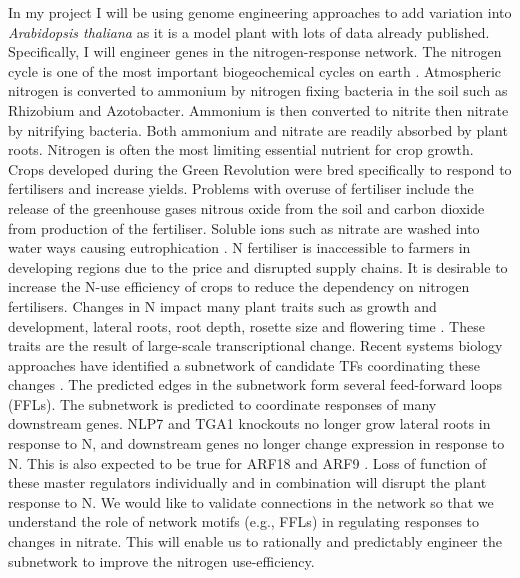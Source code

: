 \documentclass[../main.tex]{subfiles}
\begin{document}
In my project I will be using genome engineering approaches to add variation into \textit{Arabidopsis thaliana} as it is a model plant with lots of data already published.
Specifically, I will engineer genes in the nitrogen\hyp{}response network.
The nitrogen cycle is one of the most important biogeochemical cycles on earth \autocite{lehnertReversingNitrogenFixation2018}.
Atmospheric nitrogen is converted to ammonium by nitrogen fixing bacteria in the soil such as Rhizobium and Azotobacter.
Ammonium is then converted to nitrite then nitrate by nitrifying bacteria.
Both ammonium and nitrate are readily absorbed by plant roots.
Nitrogen is often the most limiting essential nutrient for crop growth.
Crops developed during the Green Revolution were bred specifically to respond to fertilisers and increase yields.
Problems with overuse of fertiliser include the release of the greenhouse gases nitrous oxide from the soil \autocite{zumftcellBiologyMolecular1997} and carbon dioxide from production of the fertiliser.
Soluble ions such as nitrate are washed into water ways causing eutrophication \autocite{gallowayChronologyHumanUnderstanding2013}.
N fertiliser is inaccessible to farmers in developing regions due to the price and disrupted supply chains.
It is desirable to increase the N\hyp{}use efficiency of crops to reduce the dependency on nitrogen fertilisers.
Changes in N impact many plant traits such as growth and development, lateral roots, root depth, rosette size and flowering time \autocite{abalosPlantTraitbasedApproaches2019,castromarinNitrateRegulatesFloral2011}.
These traits are the result of large\hyp{}scale transcriptional change.
Recent systems biology approaches have identified a subnetwork of candidate TFs coordinating these changes \autocite{gaudinierTranscriptionalRegulationNitrogenassociated2018,varalaTemporalTranscriptionalLogic2018}.
The predicted edges in the subnetwork form several feed\hyp{}forward loops (FFLs).
The subnetwork is predicted to coordinate responses of many downstream genes.
NLP7 and TGA1 knockouts no longer grow lateral roots in response to N, and downstream genes no longer change expression in response to N.
This is also expected to be true for ARF18 and ARF9 \autocite{gaudinierTranscriptionalRegulationNitrogenassociated2018}.
Loss of function of these master regulators individually and in combination will disrupt the plant response to N.
We would like to validate connections in the network so that we understand the role of network motifs (e.g., FFLs) in regulating responses to changes in nitrate.
This will enable us to rationally and predictably engineer the subnetwork to improve the nitrogen use\hyp{}efficiency.
\end{document}
